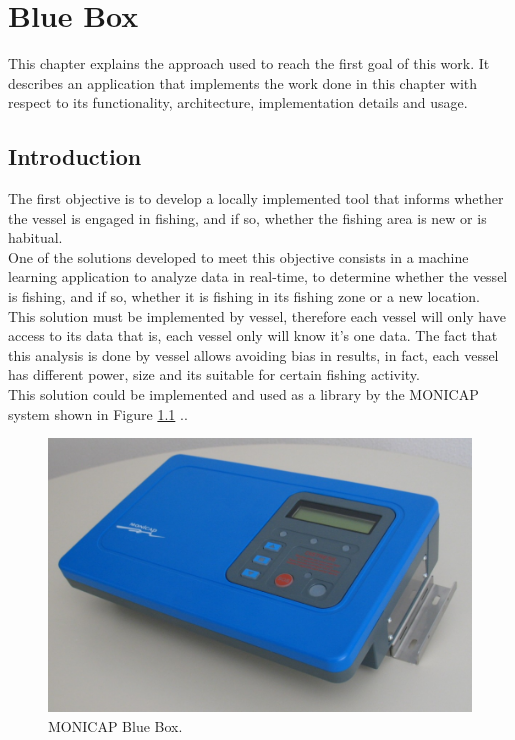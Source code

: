 % 
%  
%
\chapter{Blue Box}
\label{cha:blue_box}
This chapter explains the approach used to reach the first goal of this work. It describes an application that implements the work done in this chapter with respect to its functionality, architecture, implementation details and usage.  

\section{Introduction} %
\label{sec:introduction}
The first objective is to develop a locally implemented tool that informs whether the vessel is engaged in fishing, and if so, whether the fishing area is new or is habitual.\\
One of the solutions developed to meet this objective consists in a machine learning application to analyze data in real-time, to determine whether the vessel is fishing, and if so, whether it is fishing in its fishing zone or a new location.\\
This solution must be implemented by vessel, therefore each vessel will only have access to its data that is, each vessel only will know it’s one data.
The fact that this analysis is done by vessel allows avoiding bias in results, in fact, each vessel has different power, size and its suitable for certain fishing activity.\\
This solution could be implemented and used as a library by the MONICAP system shown in Figure \ref{fig:monicap} .\cite{WEBSITE:MonicapXsealence}.

\begin{figure}[H]
    \centering
    \includegraphics[width=0.8\linewidth]{Chapters/img/equipamento_monicap.png}
    \caption{MONICAP Blue Box.}
    \label{fig:monicap}
\end{figure}

